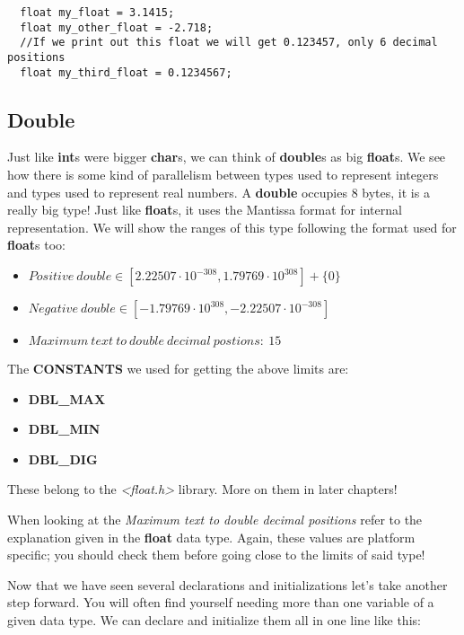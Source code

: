 \documentclass[12pt]{book}
\begin{document}
\begin{verbatim}
  float my_float = 3.1415;
  float my_other_float = -2.718;
  //If we print out this float we will get 0.123457, only 6 decimal positions
  float my_third_float = 0.1234567;
\end{verbatim}

\subsection{Double}

Just like \textbf{int}s were bigger \textbf{char}s, we can think of \textbf{double}s as big \textbf{float}s. We see how there is some kind of parallelism between types used to represent integers and types used to represent real numbers. A \textbf{double} occupies 8 bytes, it is a really big type! Just like \textbf{float}s, it uses the Mantissa format for internal representation. We will show the ranges of this type following the format used for \textbf{float}s too:

\begin{itemize}
  \item $Positive\ double \in [2.22507 \cdot 10^{-308}, 1.79769 \cdot 10^{308}] + \{0\}$
  \item $Negative\ double \in [-1.79769 \cdot 10^{308}, -2.22507 \cdot 10^{-308}]$
  \item $Maximum\ text\ to\ double\ decimal\ postions:\ 15$
\end{itemize}

The \textbf{CONSTANTS} we used for getting the above limits are:

\begin{itemize}
  \item \textbf{DBL\_MAX}
  \item \textbf{DBL\_MIN}
  \item \textbf{DBL\_DIG}
\end{itemize}

These belong to the \textit{\textless float.h\textgreater} library. More on them in later chapters!

When looking at the \textit{Maximum text to double decimal positions} refer to the explanation given in the \textbf{float} data type. Again, these values are platform specific; you should check them before going close to the limits of said type!

Now that we have seen several declarations and initializations let's take another step forward. You will often find yourself needing more than one variable of a given data type. We can declare and initialize them all in one line like this:
\end{document}
